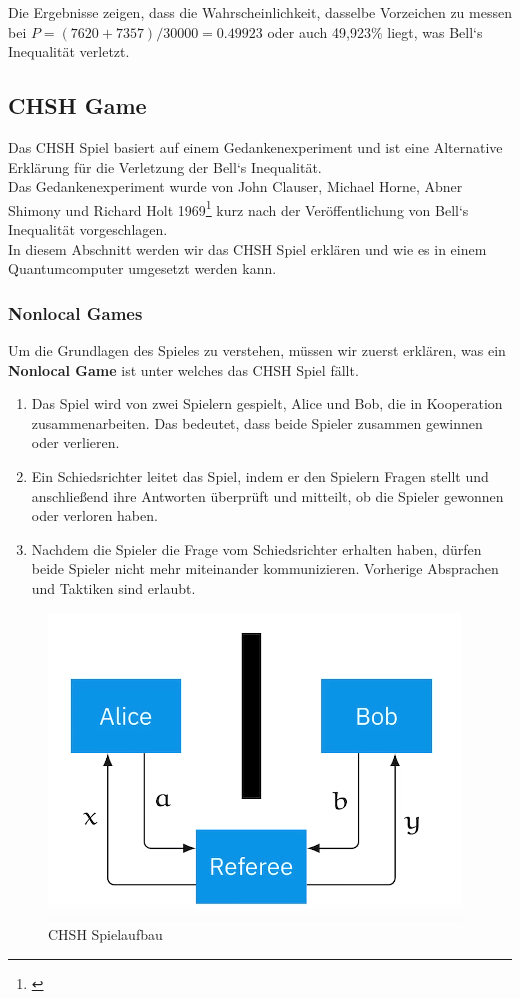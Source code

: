 Die Ergebnisse zeigen, dass die Wahrscheinlichkeit, dasselbe Vorzeichen zu messen bei $P = (7620 + 7357) / 30000 = 0.49923$ oder auch 49,923\% liegt, was Bell`s Inequalität verletzt.\\


\subsection{CHSH Game}
\label{subsec:chsh_experimentell}
Das CHSH Spiel basiert auf einem Gedankenexperiment und ist eine Alternative Erklärung für die Verletzung der Bell`s Inequalität.\\
Das Gedankenexperiment wurde von John Clauser, Michael Horne, Abner Shimony und Richard Holt 1969\footnote{\cite{clauser_proposed_1969}} kurz nach der Veröffentlichung von Bell`s Inequalität vorgeschlagen.\\

In diesem Abschnitt werden wir das CHSH Spiel erklären und wie es in einem Quantumcomputer umgesetzt werden kann.\\

\subsubsection{Nonlocal Games}
\label{subsubsec:chsh_nonlocal}

Um die Grundlagen des Spieles zu verstehen, müssen wir zuerst erklären, was ein \textbf{Nonlocal Game} ist unter welches das CHSH Spiel fällt.
\begin{enumerate}
    \item Das Spiel wird von zwei Spielern gespielt, Alice und Bob, die in Kooperation zusammenarbeiten. Das bedeutet, dass beide Spieler zusammen gewinnen oder verlieren.
    \item Ein Schiedsrichter leitet das Spiel, indem er den Spielern Fragen stellt und anschließend ihre Antworten überprüft und mitteilt, ob die Spieler gewonnen oder verloren haben.
    \item Nachdem die Spieler die Frage vom Schiedsrichter erhalten haben, dürfen beide Spieler nicht mehr miteinander kommunizieren. Vorherige Absprachen und Taktiken sind erlaubt.
\end{enumerate}

\begin{figure}[H]
    \centering
    \includegraphics[width=0.6\linewidth]{img/CHSH-drawing.png}
    \caption{CHSH Spielaufbau \protect\cite[47m20s]{IBM_chsh_2025}}
    \label{fig:CHSHGame}
\end{figure}

